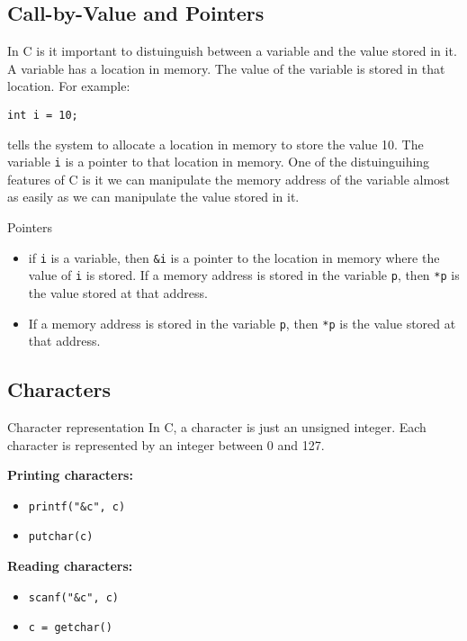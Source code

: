 \documentclass[a4paper, 10pt]{article}
\begin{document}
\subsection{Call-by-Value and Pointers}
In C is it important to distuinguish between a variable and the value stored in it. A variable has a location in memory. The value of the variable is stored in that location. For example:
\begin{lstlisting}[style=cStyle]
int i = 10;
\end{lstlisting}
tells the system to allocate a location in memory to store the value 10. The variable \texttt{i} is a pointer to that location in memory. One of the distuinguihing features of C is it we can manipulate the memory address of the variable almost as easily as we can manipulate the value stored in it.
\begin{conceptbox}{Pointers}{}
    \begin{itemize}
        \item if \texttt{i} is a variable, then \texttt{\&i} is a pointer to the location in memory where the value of \texttt{i} is stored.
              If a memory address is stored in the variable \texttt{p}, then \texttt{*p} is the value stored at that address.
        \item If a memory address is stored in the variable \texttt{p}, then \texttt{*p} is the value stored at that address.
    \end{itemize}
\end{conceptbox}
\pagebreak
\subsection{Characters}
\begin{conceptbox}{Character representation}{}
    In C, a character is just an unsigned integer. Each character is represented by an integer between 0 and 127.
\end{conceptbox}

\begin{minipage}{0.45\textwidth}
    \textbf{Printing characters:}

    \begin{itemize}
        \item \texttt{printf("\&c", c)}
        \item \texttt{putchar(c)}
    \end{itemize}
\end{minipage}
\begin{minipage}{0.45\textwidth}
    \textbf{Reading characters:}
    \begin{itemize}
        \item \texttt{scanf("\&c", c)}
        \item \texttt{c = getchar()}
    \end{itemize}
\end{minipage}
\end{document}
